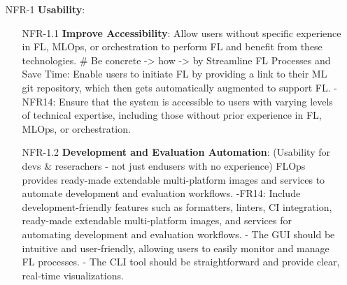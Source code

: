\begin{itemize}
    \item [NFR-1] {\textbf{Usability}}:
        \begin{itemize}
        \item [NFR-1.1] \textbf{Improve Accessibility}:
            Allow users without specific experience in FL, MLOps, or orchestration to perform FL and benefit from these technologies.
            # Be concrete -> how     
            -> by Streamline FL Processes and Save Time:
            Enable users to initiate FL by providing a link to their ML git repository, which then gets automatically augmented to support FL.
            - NFR14: Ensure that the system is accessible to users with varying levels of technical expertise, including those without prior experience in FL, MLOps, or orchestration.
        \item [NFR-1.2] \textbf{Development and Evaluation Automation}: (Usability for devs & reserachers - not just endusers with no experience)
            FLOps provides ready-made extendable multi-platform images and services to automate development and evaluation workflows.    
            -FR14: Include development-friendly features such as formatters, linters, CI integration, ready-made extendable multi-platform images, and services for automating development and evaluation workflows.
            - The GUI should be intuitive and user-friendly, allowing users to easily monitor and manage FL processes.
            - The CLI tool should be straightforward and provide clear, real-time visualizations.


\end{itemize}
\end{itemize}
